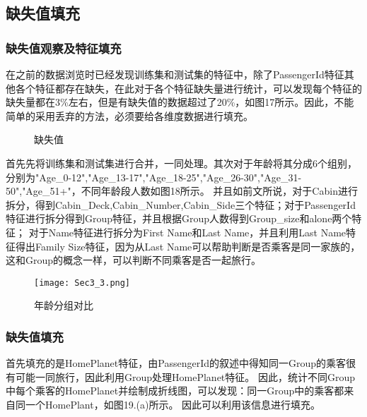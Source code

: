 \documentclass[../main.tex]{subfiles}
\begin{document}
    \subsection{缺失值填充}

        \subsubsection{缺失值观察及特征填充}

        在之前的数据浏览时已经发现训练集和测试集的特征中，除了PassengerId特征其他各个特征都存在缺失，在此对于各个特征缺失量进行统计，可以发现每个特征的缺失量都在3\%左右，但是有缺失值的数据超过了20\%，如图17所示。因此，不能简单的采用丢弃的方法，必须要给各维度数据进行填充。

        \begin{figure}[H]
            \centering
            \caption{缺失值}
        \end{figure}

        首先先将训练集和测试集进行合并，一同处理。其次对于年龄将其分成6个组别，分别为"Age\_0-12","Age\_13-17","Age\_18-25","Age\_26-30","Age\_31-50","Age\_51+"，不同年龄段人数如图18所示。
        并且如前文所说，对于Cabin进行拆分，得到Cabin\_Deck,Cabin\_Number,Cabin\_Side三个特征；对于PassengerId特征进行拆分得到Group特征，并且根据Group人数得到Group\_size和alone两个特征；
        对于Name特征进行拆分为First Name和Last Name，并且利用Last Name特征得出Family Size特征，因为从Last Name可以帮助判断是否乘客是同一家族的，这和Group的概念一样，可以判断不同乘客是否一起旅行。

        \begin{figure}[H]
            \centering
            \texttt{[image: Sec3\_3.png]}
            \caption{年龄分组对比}
        \end{figure}

        \subsubsection{缺失值填充}

            首先填充的是HomePlanet特征，由PassengerId的叙述中得知同一Group的乘客很有可能一同旅行，因此利用Group处理HomePlanet特征。
            因此，统计不同Group中每个乘客的HomePlanet并绘制成折线图，可以发现：同一Group中的乘客都来自同一个HomePlant，如图19.(a)所示。
            因此可以利用该信息进行填充。
\end{document}
